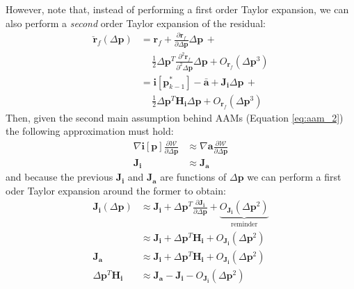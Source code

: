 However, note that, instead of performing a first order Taylor expansion, we can also perform a \emph{second} order Taylor expansion of the residual:
\begin{equation}
    \begin{aligned}
		\check{\mathbf{r}}_f(\Delta\mathbf{p}) & = \mathbf{r}_f + \frac{\partial \mathbf{r}_f}{\partial\Delta \mathbf{p}}\Delta\mathbf{p} \,+
		\\
		& \quad \, \frac{1}{2} \Delta\mathbf{p}^T\frac{\partial^2 \mathbf{r}_f}{\partial^2\Delta \mathbf{p}}\Delta\mathbf{p} + O_{\mathbf{r}_f}(\Delta\mathbf{p}^3)
		\\
		& = \mathbf{i}[\mathbf{p}_{k-1}^*] - \bar{\mathbf{a}} + \mathbf{J}_\mathbf{i}\Delta\mathbf{p} \, +
		\\
		& \quad \, \frac{1}{2} \Delta\mathbf{p}^T\mathbf{H}_\mathbf{i}\Delta\mathbf{p} + O_{\mathbf{r}_f}(\Delta\mathbf{p}^3)
    \label{eq:po_forward_residual_taylor2}
    \end{aligned}
\end{equation}
Then, given the second main assumption behind AAMs (Equation \ref{eq:aam_2}) the following approximation must hold:
\begin{equation}
	\begin{aligned}
		\nabla\mathbf{i}[\mathbf{p}] \frac{\partial\mathcal{W}}{\partial\Delta\mathbf{p}} & \approx \nabla\mathbf{a} \frac{\partial\mathcal{W}}{\partial\Delta\mathbf{p}}
		\\
		\mathbf{J}_\mathbf{i} & \approx \mathbf{J}_\mathbf{a}
		\label{eq:jacobian_aproximation}
	\end{aligned}
\end{equation}
and because the previous $\mathbf{J}_\mathbf{i}$ and $\mathbf{J}_\mathbf{a}$ are functions of $\Delta\mathbf{p}$ we can perform a first oder Taylor expansion around the former to obtain:
\begin{equation}
	\begin{aligned}
	\mathbf{J}_\mathbf{i} (\Delta\mathbf{p}) & \approx \mathbf{J}_\mathbf{i} + \Delta\mathbf{p}^T \frac{\partial\mathbf{J}_\mathbf{i}}{\partial\Delta\mathbf{p}} + \underbrace{O_{\mathbf{J}_\mathbf{i}}(\Delta\mathbf{p}^2)}_{\textrm{reminder}}
	\\
	& \approx \mathbf{J}_\mathbf{i} + \Delta\mathbf{p}^T \mathbf{H}_\mathbf{i} + O_{\mathbf{J}_\mathbf{i}}(\Delta\mathbf{p}^2)
	\\
	\mathbf{J}_\mathbf{a} & \approx  \mathbf{J}_\mathbf{i} + \Delta\mathbf{p}^T \mathbf{H}_\mathbf{i} + O_{\mathbf{J}_\mathbf{i}}(\Delta\mathbf{p}^2)
	\\
	\Delta\mathbf{p}^T \mathbf{H}_\mathbf{i} & \approx \mathbf{J}_\mathbf{a} - \mathbf{J}_\mathbf{i} - O_{\mathbf{J}_\mathbf{i}}(\Delta\mathbf{p}^2)
	\label{eq:jacobian_taylor}
	\end{aligned}
\end{equation}

